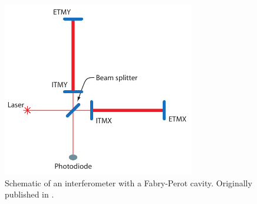 \begin{figure}[htbp]
\center
\includegraphics[height=3in]{figures/fabry-perot.pdf}
\caption{Schematic of an interferometer with a Fabry-Perot cavity. Originally published in \cite{Brown}.}
\label{fig:fabry_perot}
\end{figure}


